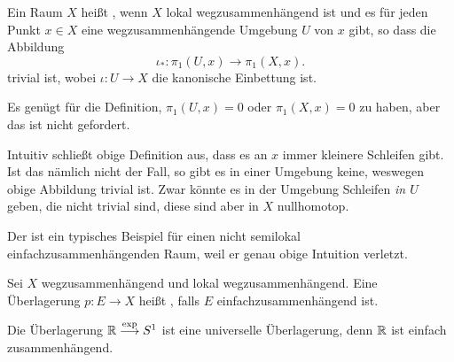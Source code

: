 \begin{definition}\label{def:semilokal-einfachzusammenhängend}
    Ein Raum $X$ heißt  , wenn $X$ lokal wegzusammenhängend ist und es für jeden Punkt  $x\in X$ eine wegzusammenhängende Umgebung $U$ von  $x$ gibt, so dass die Abbildung
    \[
        ι_* \colon  \pi_1(U,x) \to  \pi_1(X,x)
    .\] 
    trivial ist, wobei $ι\colon  U \to  X$ die kanonische Einbettung ist.
\end{definition}

\begin{remark}
    Es genügt für die Definition, $\pi_1(U,x) = 0$ oder $\pi_1(X,x) = 0$ zu haben, aber das ist nicht gefordert.
\end{remark}

\begin{example}\label{ex:hawaiian-earring}
    Intuitiv schließt obige Definition aus, dass es an $x$ immer kleinere Schleifen gibt. Ist das nämlich nicht der Fall, so gibt es in einer Umgebung keine, weswegen obige Abbildung trivial ist. Zwar könnte es in der Umgebung Schleifen  \textit{in $U$} geben, die nicht trivial sind, diese sind aber in $X$ nullhomotop.

    Der  ist ein typisches Beispiel für einen nicht semilokal einfachzusammenhängenden Raum, weil er genau obige Intuition verletzt.

    \begin{minipage}{\textwidth}
        \centering
    \end{minipage}
\end{example}

\begin{definition}\label{def:universelle-überlagerung}
    Sei $X$ wegzusammenhängend und lokal wegzusammenhängend. Eine Überlagerung  $p\colon  E \to X$ heißt , falls $E$ einfachzusammenhängend ist. 
\end{definition}

\begin{example}
    Die Überlagerung  $\mathbb{R} \stackrel{\exp }{\longrightarrow} S^1$ ist eine universelle Überlagerung, denn $\mathbb{R}$ ist einfach zusammenhängend.
\end{example}


